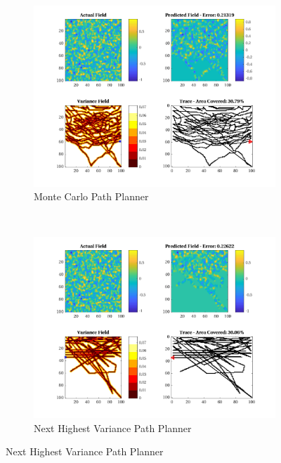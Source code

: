 \begin{figure}[htb!]
    \centering
    \begin{subfigure}[t]{0.5\textwidth}
        \centering
        \includegraphics[width=\linewidth]{figures/hbresults/mc_30p_100x100_sf_1_seed_3.png}
        \captionsetup{skip=0.10\baselineskip,size=footnotesize}
        \caption{Monte Carlo Path Planner}
    \end{subfigure}%
    ~ 
    \begin{subfigure}[t]{0.5\textwidth}
        \centering
        \includegraphics[width=\linewidth]{figures/hbresults/nhv_30p_100x100_sf_1_seed_3.png}
        \captionsetup{skip=0.10\baselineskip,size=footnotesize}
        \caption{Next Highest Variance Path Planner}

\end{subfigure}
\end{figure}

